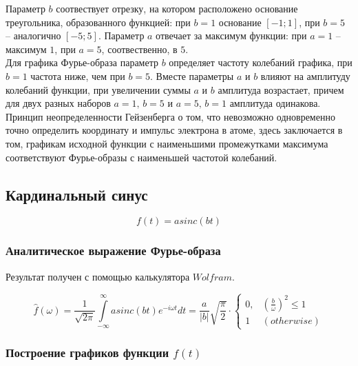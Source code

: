 \documentclass[a5paper, 10pt]{article}
\theoremstyle{definition}
\theoremstyle{plain}
\theoremstyle{remark}
\begin{document}
Параметр $b$ соотвествует отрезку, на котором расположено основание треугольника, образованного функцией: при $b=1$ основание $[-1; 1]$, при $b=5$ -- аналогично $[-5; 5]$. Параметр $a$ отвечает за максимум функции: при $a=1$ -- максимум $1$, при $a=5$, соотвественно, в $5$.\\
Для графика Фурье-образа параметр $b$ определяет частоту колебаний графика, при $b=1$ частота ниже, чем при $b=5$.  Вместе параметры $a$ и $b$ влияют на амплитуду колебаний функции, при увеличении суммы $a$ и $b$ амплитуда возрастает, причем для двух разных наборов $a = 1, \, b=5$ и $a=5, \, b=1$ амплитуда одинакова.\\
Принцип неопределенности Гейзенберга о том, что невозможно одновременно точно определить координату и импульс электрона в атоме, здесь заключается в том, графикам исходной функции с наименьшими промежутками максимума соответствуют Фурье-образы с наименьшей частотой колебаний.





\newpage
\subsection{Кардинальный синус}
\begin{equation}
f(t) = a sinc(bt)
\end{equation}


\subsubsection{Аналитическое выражение Фурье-образа}

Результат получен с помощью калькулятора $Wolfram$.

\begin{equation}
\hat{f}(\omega) =
 \frac{1}{\sqrt{2 \pi}} \int \limits_{-\infty}^{\infty}  a sinc(bt) e^{-i \omega t} dt = 
 \frac{a}{|b|} \sqrt{\frac{\pi}{2}} \cdot
\begin{cases}
0, & \left( \frac{b}{\omega} \right)^2 \leq 1\\
1 & (otherwise)
\end{cases}
\end{equation}


\subsubsection{Построение графиков функции $f(t)$}
\end{document}
